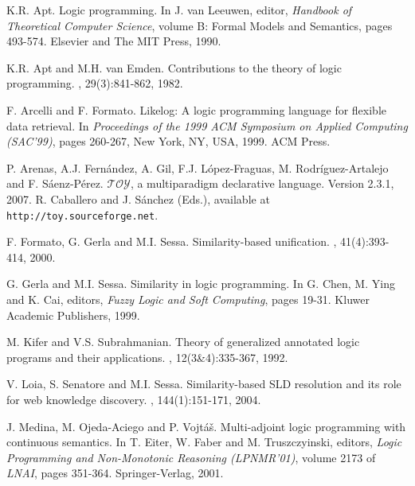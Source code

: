 \documentclass{sigplanconf}
\theoremstyle{definition}
\theoremstyle{plain}
\begin{document}

\begin{thebibliography}{22}

K.R. Apt.
\newblock Logic programming.
\newblock In J. van Leeuwen, editor, {\em Handbook of Theoretical Computer Science}, volume B: Formal Models and Semantics, pages 493-574. Elsevier and The MIT Press, 1990.

K.R. Apt and M.H. van Emden.
\newblock Contributions to the theory of logic programming.
, 29(3):841-862, 1982.

F. Arcelli and F. Formato.
\newblock Likelog: A logic programming language for flexible data retrieval.
\newblock In {\em Proceedings of the 1999 ACM Symposium on Applied Computing (SAC'99)}, pages 260-267, New York, NY, USA, 1999. ACM Press.

P. Arenas, A.J. Fern\'andez, A. Gil, F.J. L\'opez-Fraguas, M. Rodr\'iguez-Artalejo and F. S\'aenz-P\'erez.
\newblock $\mathcal{TOY}$, a multiparadigm declarative language. Version 2.3.1, 2007.
\newblock R. Caballero and J. S\'anchez (Eds.), available at \texttt{http://toy.sourceforge.net}.

F. Formato, G. Gerla and M.I. Sessa.
\newblock Similarity-based unification.
, 41(4):393-414, 2000.

\vfill\eject

G. Gerla and M.I. Sessa.
\newblock Similarity in logic programming.
\newblock In G. Chen, M. Ying and K. Cai, editors, {\em Fuzzy Logic and Soft Computing}, pages 19-31. Kluwer Academic Publishers, 1999.

M. Kifer and V.S. Subrahmanian.
\newblock Theory of generalized annotated logic programs and their applications.
, 12(3\&4):335-367, 1992.

V. Loia, S. Senatore and M.I. Sessa.
\newblock Similarity-based SLD resolution and its role for web knowledge discovery.
, 144(1):151-171, 2004.

J. Medina, M. Ojeda-Aciego and P. Vojt\'a\v{s}.
\newblock Multi-adjoint logic programming with continuous semantics.
\newblock In T. Eiter, W. Faber and M. Truszczyinski, editors, {\em Logic Programming and Non-Monotonic Reasoning (LPNMR'01)}, volume 2173 of {\em LNAI}, pages 351-364. Springer-Verlag, 2001.


\end{thebibliography}
\end{document}
